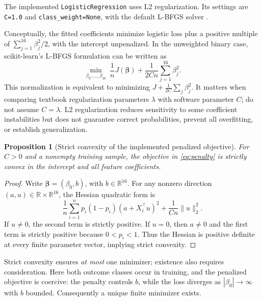 \documentclass[11pt,a4paper]{article}
\newtheorem{proposition}{Proposition}[section]\newtheorem{remark}{Remark}[section]
\begin{document}
The implemented \texttt{LogisticRegression} uses L2 regularization. Its settings are \texttt{C=1.0} and \texttt{class\_weight=None}, with the default L-BFGS solver \cite{sklogreg,nocedal2006}.\par\smallskip\noindent Conceptually, the fitted coefficients minimize logistic loss plus a positive multiple of $\sum_{j=1}^{16}\beta_j^2/2$, with the intercept unpenalized. In the unweighted binary case, scikit-learn's L-BFGS formulation can be written as
\begin{equation}\label{eq:penalty}\min_{\beta_0,\ldots,\beta_{16}}\ \frac1nJ(\bm\beta)+\frac{1}{2Cn}\sum_{j=1}^{16}\beta_j^2.\end{equation}
This normalization is equivalent to minimizing $J+\frac{1}{2C}\sum_j\beta_j^2$. It matters when comparing textbook regularization parameters $\lambda$ with software parameter $C$; do not assume $C=\lambda$. L2 regularization reduces sensitivity to some coefficient instabilities but does not guarantee correct probabilities, prevent all overfitting, or establish generalization.
\begin{proposition}[Strict convexity of the implemented penalized objective]
For $C>0$ and a nonempty training sample, the objective in
\eqref{eq:penalty} is strictly convex in the intercept and all
feature coefficients.
\end{proposition}
\begin{proof}
Write $\bm\beta=(\beta_0,b)$, with $b\in\mathbb R^{16}$.
For any nonzero direction $(a,u)\in\mathbb R\times\mathbb R^{16}$,
the Hessian quadratic form is
\[
\frac1n\sum_{i=1}^n p_i(1-p_i)(a+X_i^\top u)^2
+\frac{1}{Cn}\lVert u\rVert_2^2.
\]
If $u\ne0$, the second term is strictly positive. If $u=0$,
then $a\ne0$ and the first term is strictly positive because
$0<p_i<1$. Thus the Hessian is positive definite at every finite
parameter vector, implying strict convexity.
\end{proof}
Strict convexity ensures \emph{at most} one minimizer; existence
also requires consideration. Here both outcome classes occur in
training, and the penalized objective is coercive: the penalty
controls $b$, while the loss diverges as $|\beta_0|\to\infty$
with $b$ bounded. Consequently a unique finite minimizer exists.
\end{document}
